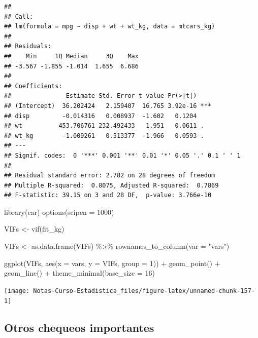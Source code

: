 \documentclass[
  12pt,
]{book}
\newenvironment{Shaded}{\begin{snugshade}}{\end{snugshade}}
\newcommand{\AttributeTok}[1]{\textcolor[rgb]{0.77,0.63,0.00}{#1}}
\newcommand{\DecValTok}[1]{\textcolor[rgb]{0.00,0.00,0.81}{#1}}
\newcommand{\FunctionTok}[1]{\textcolor[rgb]{0.00,0.00,0.00}{#1}}
\newcommand{\NormalTok}[1]{#1}
\newcommand{\OtherTok}[1]{\textcolor[rgb]{0.56,0.35,0.01}{#1}}
\newcommand{\SpecialCharTok}[1]{\textcolor[rgb]{0.00,0.00,0.00}{#1}}
\newcommand{\StringTok}[1]{\textcolor[rgb]{0.31,0.60,0.02}{#1}}
\theoremstyle{definition}
\theoremstyle{definition}
\theoremstyle{definition}
\theoremstyle{definition}
\theoremstyle{remark}
\begin{document}
\begin{verbatim}
## 
## Call:
## lm(formula = mpg ~ disp + wt + wt_kg, data = mtcars_kg)
## 
## Residuals:
##    Min     1Q Median     3Q    Max 
## -3.567 -1.855 -1.014  1.655  6.686 
## 
## Coefficients:
##               Estimate Std. Error t value Pr(>|t|)    
## (Intercept)  36.202424   2.159407  16.765 3.92e-16 ***
## disp         -0.014316   0.008937  -1.602   0.1204    
## wt          453.706761 232.492433   1.951   0.0611 .  
## wt_kg        -1.009261   0.513377  -1.966   0.0593 .  
## ---
## Signif. codes:  0 '***' 0.001 '**' 0.01 '*' 0.05 '.' 0.1 ' ' 1
## 
## Residual standard error: 2.782 on 28 degrees of freedom
## Multiple R-squared:  0.8075, Adjusted R-squared:  0.7869 
## F-statistic: 39.15 on 3 and 28 DF,  p-value: 3.766e-10
\end{verbatim}

\begin{Shaded}
\begin{Highlighting}[]
\FunctionTok{library}\NormalTok{(car)}
\FunctionTok{options}\NormalTok{(}\AttributeTok{scipen =} \DecValTok{1000}\NormalTok{)}

\NormalTok{VIFs }\OtherTok{\textless{}{-}} \FunctionTok{vif}\NormalTok{(fit\_kg)}

\NormalTok{VIFs }\OtherTok{\textless{}{-}} \FunctionTok{as.data.frame}\NormalTok{(VIFs) }\SpecialCharTok{\%\textgreater{}\%}
    \FunctionTok{rownames\_to\_column}\NormalTok{(}\AttributeTok{var =} \StringTok{"vars"}\NormalTok{)}

\FunctionTok{ggplot}\NormalTok{(VIFs, }\FunctionTok{aes}\NormalTok{(}\AttributeTok{x =}\NormalTok{ vars, }\AttributeTok{y =}\NormalTok{ VIFs, }\AttributeTok{group =} \DecValTok{1}\NormalTok{)) }\SpecialCharTok{+}
    \FunctionTok{geom\_point}\NormalTok{() }\SpecialCharTok{+} \FunctionTok{geom\_line}\NormalTok{() }\SpecialCharTok{+} \FunctionTok{theme\_minimal}\NormalTok{(}\AttributeTok{base\_size =} \DecValTok{16}\NormalTok{)}
\end{Highlighting}
\end{Shaded}

\begin{center}\texttt{[image: Notas-Curso-Estadistica\_files/figure-latex/unnamed-chunk-157-1]} \end{center}

\hypertarget{otros-chequeos-importantes}{%
\subsection{Otros chequeos importantes}\label{otros-chequeos-importantes}}
\end{document}
